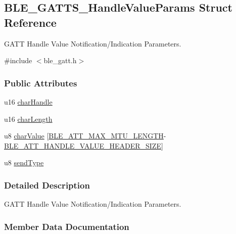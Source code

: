 \hypertarget{struct_b_l_e___g_a_t_t_s___handle_value_params}{}\subsection{B\+L\+E\+\_\+\+G\+A\+T\+T\+S\+\_\+\+Handle\+Value\+Params Struct Reference}
\label{struct_b_l_e___g_a_t_t_s___handle_value_params}


G\+A\+TT Handle Value Notification/\+Indication Parameters.  




{\ttfamily \#include $<$ble\+\_\+gatt.\+h$>$}

\subsubsection*{Public Attributes}
\begin{DoxyCompactItemize}
\item 
u16 \hyperlink{struct_b_l_e___g_a_t_t_s___handle_value_params_a74024c717d1cf91370ab5ac06f40bb48}{char\+Handle}
\item 
u16 \hyperlink{struct_b_l_e___g_a_t_t_s___handle_value_params_a2f45531812e6178458ba31958827fd7a}{char\+Length}
\item 
u8 \hyperlink{struct_b_l_e___g_a_t_t_s___handle_value_params_a89292fc9986fdda9f63f9d63d23838ec}{char\+Value} \mbox{[}\hyperlink{group___b_l_e___g_a_t_t_ga380151ce5e77dadfae069f37afd70b8b}{B\+L\+E\+\_\+\+A\+T\+T\+\_\+\+M\+A\+X\+\_\+\+M\+T\+U\+\_\+\+L\+E\+N\+G\+TH}-\/\hyperlink{group___b_l_e___g_a_t_t_ga824bb76855b7f0e87c25d8050b1d94bd}{B\+L\+E\+\_\+\+A\+T\+T\+\_\+\+H\+A\+N\+D\+L\+E\+\_\+\+V\+A\+L\+U\+E\+\_\+\+H\+E\+A\+D\+E\+R\+\_\+\+S\+I\+ZE}\mbox{]}
\item 
u8 \hyperlink{struct_b_l_e___g_a_t_t_s___handle_value_params_ac6eec504da20e273acb8e10f0482f21f}{send\+Type}
\end{DoxyCompactItemize}


\subsubsection{Detailed Description}
G\+A\+TT Handle Value Notification/\+Indication Parameters. 

\subsubsection{Member Data Documentation}

